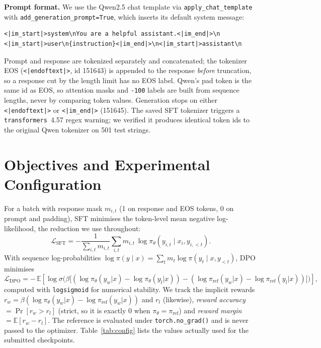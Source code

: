 \documentclass[10pt]{article}
\begin{document}
\textbf{Prompt format.} We use the Qwen2.5 chat template via \texttt{apply\_chat\_template}
with \texttt{add\_generation\_prompt=True}, which inserts its default system message:
\begin{Verbatim}[fontsize=\scriptsize,frame=single]
<|im_start|>system\nYou are a helpful assistant.<|im_end|>\n
<|im_start|>user\n{instruction}<|im_end|>\n<|im_start|>assistant\n
\end{Verbatim}
Prompt and response are tokenized separately and concatenated; the tokenizer EOS
(\texttt{<|endoftext|>}, id 151643) is appended to the response \emph{before} truncation, so a
response cut by the length limit has no EOS label. Qwen's pad token is the same id as EOS, so
attention masks and \texttt{-100} labels are built from sequence lengths, never by comparing token
values. Generation stops on either \texttt{<|endoftext|>} or \texttt{<|im\_end|>} (151645). The
saved SFT tokenizer triggers a \texttt{transformers}~4.57 regex warning; we verified it produces
identical token ids to the original Qwen tokenizer on 501 test strings.

\section{Objectives and Experimental Configuration}
For a batch with response mask $m_{i,t}$ (1 on response and EOS tokens, 0 on prompt and padding),
SFT minimises the token-level mean negative log-likelihood, the reduction we use throughout:
\begin{equation}
\mathcal{L}_{\text{SFT}} = -\frac{1}{\sum_{i,t} m_{i,t}} \sum_{i,t} m_{i,t}\,
\log \pi_\theta\!\left(y_{i,t}\mid x_i, y_{i,<t}\right).
\end{equation}
With sequence log-probabilities $\log\pi(y\mid x)=\sum_t m_t \log\pi(y_t\mid x,y_{<t})$, DPO minimises
\begin{equation}
\mathcal{L}_{\text{DPO}} = -\,\mathbb{E}\left[\log\sigma\!\Big(
\beta\big[(\log\pi_\theta(y_w|x)-\log\pi_\theta(y_l|x)) - (\log\pi_{\text{ref}}(y_w|x)-\log\pi_{\text{ref}}(y_l|x))\big]\Big)\right],
\end{equation}
computed with \texttt{logsigmoid} for numerical stability. We track the implicit rewards
$r_w=\beta(\log\pi_\theta(y_w|x)-\log\pi_{\text{ref}}(y_w|x))$ and $r_l$ (likewise),
\emph{reward accuracy} $=\Pr[r_w>r_l]$ (strict, so it is exactly 0 when $\pi_\theta=\pi_{\text{ref}}$)
and \emph{reward margin} $=\mathbb{E}[r_w-r_l]$. The reference is evaluated under
\texttt{torch.no\_grad()} and is never passed to the optimizer. Table~\ref{tab:config} lists the
values actually used for the submitted checkpoints.
\end{document}
